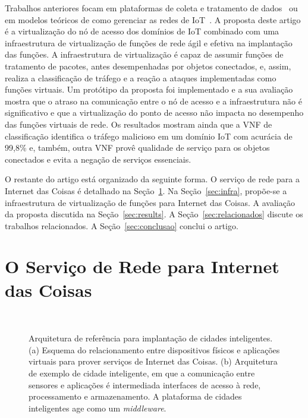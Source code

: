 \documentclass[12pt]{article}
\begin{document}
Trabalhos anteriores focam em plataformas de coleta e tratamento de dados~\cite{petrolo,zhang-security,interscity-paper} ou em modelos teóricos de como gerenciar as redes de IoT~\cite{sdn-iot,sdn-nfv-iot,globecomm-nfv-iot}. A proposta deste artigo é a virtualização do nó de acesso dos domínios de IoT combinado com uma infraestrutura de virtualização de funções de rede ágil e efetiva na implantação das funções. A infraestrutura de virtualização é capaz de assumir funções de tratamento de pacotes, antes desempenhadas por objetos conectados, e, assim, realiza a classificação de tráfego e a reação a ataques implementadas como funções virtuais. Um protótipo da proposta foi implementado e a sua avaliação mostra que o atraso na comunicação entre o nó de acesso e a infraestrutura não é significativo  e que a virtualização do ponto de acesso não impacta no desempenho das funções virtuais de rede. Os resultados mostram ainda que a VNF de classificação identifica o tráfego malicioso em um domínio IoT com acurácia de 99,8\% e, também, outra VNF provê qualidade de serviço para os objetos conectados e evita a negação de serviços essenciais.%

O restante do artigo está organizado da seguinte forma. O serviço de rede para a Internet das Coisas é detalhado na Seção~\ref{sec:net-iot}. Na Seção~\ref{sec:infra}, propõe-se a infraestrutura de virtualização de funções para Internet das Coisas. A avaliação da proposta discutida na Seção~\ref{sec:results}. A Seção~\ref{sec:relacionados} discute os trabalhos relacionados. A Seção~\ref{sec:conclusao} conclui o artigo.


\section{O Serviço de Rede para Internet das Coisas}
\label{sec:net-iot}


\begin{figure}[t!]
\begin{center}
\mbox{
}
\hspace{1mm}
\mbox{
}
\end{center}
\vspace{-3mm}
\caption{Arquitetura de referência para implantação de cidades inteligentes. (a) Esquema do relacionamento entre dispositivos físicos e aplicações virtuais para prover serviços de Internet das Coisas. (b) Arquitetura de exemplo de cidade inteligente, em que a comunicação entre sensores e aplicações é intermediada interfaces de acesso à rede, processamento e armazenamento. A plataforma de cidades inteligentes age como um \textit{middleware}.}
\label{fig:topos}
\vspace{-4mm}
\end{figure}
\end{document}
